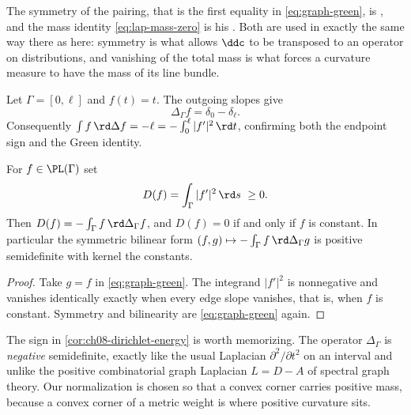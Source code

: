 The symmetry of the pairing, that is the first equality in
\eqref{eq:graph-green}, is \cite[Prop.~1.2.13]{Thu05}, and the mass identity
\eqref{eq:lap-mass-zero} is his \cite[Cor.~1.2.14]{Thu05}.  Both are used in
exactly the same way there as here: symmetry is what allows $\ddc$ to be
transposed to an operator on distributions, and vanishing of the total mass
is what forces a curvature measure to have the mass of its line bundle.

\begin{example}
\label{ex:ch08-laplacian-segment}
Let $\Gamma=[0,\ell]$ and $f(t)=t$.  The outgoing slopes give
\[
                         \Delta_\Gamma f=\delta_0-\delta_\ell.
\]
Consequently
$\int f\,\rd \Delta f=-\ell=-\int_0^\ell|f'|^2\,\rd t$, confirming both the endpoint
sign and the Green identity.
\end{example}

\begin{corollary}
\label{cor:ch08-dirichlet-energy}
For $f\in\PL(\Gamma)$ set
\[
                 D(f)=\int_\Gamma|f'|^2\,\rd s\ \geq 0 .
\]
Then $D(f)=-\int_\Gamma f\,\rd\Delta_\Gamma f$, and $D(f)=0$ if and only if
$f$ is constant.  In particular the symmetric bilinear form
$(f,g)\mapsto-\int_\Gamma f\,\rd\Delta_\Gamma g$ is positive semidefinite
with kernel the constants.
\end{corollary}

\begin{proof}
Take $g=f$ in \eqref{eq:graph-green}.  The integrand $|f'|^2$ is nonnegative
and vanishes identically exactly when every edge slope vanishes, that is,
when $f$ is constant.  Symmetry and bilinearity are
\eqref{eq:graph-green} again.
\end{proof}

The sign in \cref{cor:ch08-dirichlet-energy} is worth memorizing.  The
operator $\Delta_\Gamma$ is \emph{negative} semidefinite, exactly like the
usual Laplacian $\partial^2/\partial t^2$ on an interval and unlike the
positive combinatorial graph Laplacian $L=D-A$ of spectral graph theory.
Our normalization is chosen so that a convex corner carries positive mass,
because a convex corner of a metric weight is where positive curvature sits.

